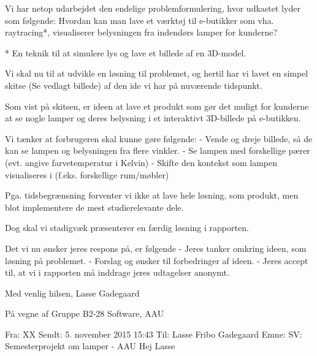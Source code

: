 Vi har netop udarbejdet den endelige problemformulering, hvor udkastet lyder som følgende:
Hvordan kan man lave et værktøj til e-butikker som vha. raytracing*, visualiserer belysningen fra indendørs lamper for kunderne? 

* En teknik til at simulere lys og lave et billede af en 3D-model. 

Vi skal nu til at udvikle en løsning til problemet, og hertil har vi lavet en simpel skitse (Se vedlagt billede) af den ide vi har på nuværende tidspunkt. 
 
Som vist på skitsen, er ideen at lave et produkt som gør det muligt for kunderne at se nogle lamper og deres belysning i et interaktivt 3D-billede på e-butikken. 

Vi tænker at forbrugeren skal kunne gøre følgende: \newline
 - Vende og dreje billede, så de kan se lampen og belysningen fra flere vinkler. \newline
 - Se lampen med forskellige pærer (evt. angive farvetemperatur i Kelvin) \newline
 - Skifte den kontekst som lampen visualiseres i (f.eks. forskellige rum/møbler)

Pga. tidsbegrænsning forventer vi ikke at lave hele løsning, som produkt, men blot implementere de mest studierelevante dele. 

Dog skal vi stadigvæk præsenterer en færdig løsning i rapporten. 

Det vi nu ønsker jeres respons på, er følgende
 - Jeres tanker omkring ideen, som løsning på problemet.\newline
 - Forslag og ønsker til forbedringer af ideen. \newline
 - Jeres accept til, at vi i rapporten må inddrage jeres udtagelser anonymt.

Med venlig hilsen,\newline
Lasse Gadegaard
 
På vegne af \newline
Gruppe B2-28\newline
Software, AAU
 
\noindent\makebox[\linewidth]{\rule{\paperwidth}{0.4pt}}

Fra: XX \newline
Sendt: 5. november 2015 15:43\newline
Til: Lasse Fribo Gadegaard\newline
Emne: SV: Semesterprojekt om lamper - AAU\newline
Hej Lasse

